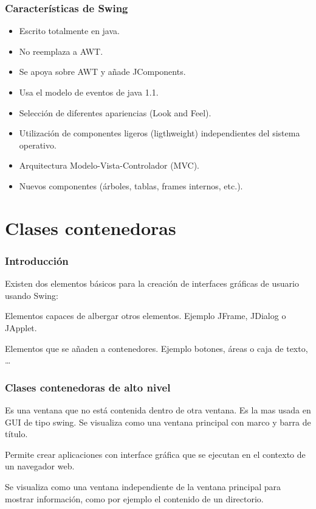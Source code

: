 \documentclass{beamer}
\begin{document}
\begin{frame}
\frametitle{Características de Swing}
\begin{itemize}[<+->]
\item Escrito totalmente en java.
\item No reemplaza a AWT.
\item Se apoya sobre AWT y añade JComponents.
\item Usa el modelo de eventos de java 1.1.
\item Selección de diferentes apariencias (Look and Feel).
\item Utilización de componentes ligeros (ligthweight) independientes del sistema operativo.
\item Arquitectura Modelo-Vista-Controlador (MVC).
\item Nuevos componentes (árboles, tablas, frames internos, etc.).
\end{itemize}
\end{frame}


\section{Clases contenedoras}

\begin{frame}
\frametitle{Introducción}
Existen dos elementos básicos para la creación de interfaces gráficas de usuario usando Swing:
\begin{description}[<+->]
\item[Contenedores:]Elementos capaces de albergar otros elementos. Ejemplo JFrame, JDialog o JApplet.
\item[Componentes:]Elementos que se añaden a contenedores. Ejemplo botones, áreas o caja de texto, \dots
\end{description}
\end{frame}




\begin{frame}
\frametitle{Clases contenedoras de alto nivel}
\begin{description}[<+->]
\item[JFrame] Es una ventana que no está contenida dentro de otra ventana. Es la mas usada en GUI de tipo swing. Se visualiza como una ventana principal con marco y barra de título.
\item[JApplet] Permite crear aplicaciones con interface gráfica que se ejecutan en el contexto de un navegador web.
\item[JDialog] Se visualiza como una ventana independiente de la ventana principal para mostrar información, como por ejemplo el contenido de un directorio.
\end{description}
\end{frame}
\end{document}
